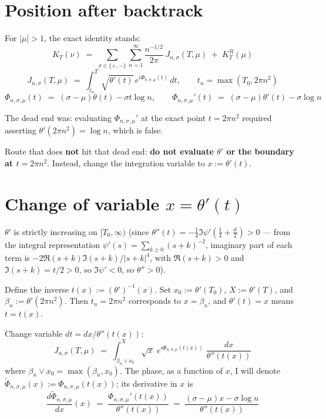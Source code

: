 \section*{Position after backtrack}

For $|\mu|>1$, the exact identity stands:
\[
K_T(\nu) \;=\; \sum_{\sigma\in\{+,-\}}\sum_{n=1}^{\infty}\frac{n^{-1/2}}{2\pi}\,J_{n,\sigma}(T,\mu) \;+\; K_T^{R}(\mu)
\]
\[
J_{n,\sigma}(T,\mu) \;=\; \int_{t_n}^{T}\sqrt{\theta'(t)}\,e^{i\Phi_{n,\sigma,\mu}(t)}\,dt,\qquad t_{n}=\max(T_{0},2\pi n^{2})
\]
\[
\Phi_{n,\sigma,\mu}(t) \;=\; (\sigma-\mu)\theta(t)-\sigma t\log n,\qquad \Phi_{n,\sigma,\mu}'(t) \;=\; (\sigma-\mu)\theta'(t)-\sigma\log n
\]

The dead end was: evaluating $\Phi_{n,\sigma,\mu}'$ at the exact point $t=2\pi n^{2}$ required asserting $\theta'(2\pi n^{2})=\log n$, which is false.

Route that does \textbf{not} hit that dead end: \textbf{do not evaluate $\theta'$ or the boundary at $t=2\pi n^{2}$}. Instead, change the integration variable to $x := \theta'(t)$.

\section*{Change of variable $x = \theta'(t)$}

$\theta'$ is strictly increasing on $[T_{0},\infty)$ (since $\theta''(t) = -\tfrac{1}{4}\Im\psi'(\tfrac{1}{4}+\tfrac{it}{2}) > 0$ --- from the integral representation $\psi'(s) = \sum_{k\ge 0}(s+k)^{-2}$, imaginary part of each term is $-2\Re(s+k)\Im(s+k)/|s+k|^4$, with $\Re(s+k)>0$ and $\Im(s+k) = t/2>0$, so $\Im\psi'<0$, so $\theta''>0$).

Define the inverse $t(x) := (\theta')^{-1}(x)$. Set $x_{0} := \theta'(T_{0})$, $X := \theta'(T)$, and $\beta_{n} := \theta'(2\pi n^{2})$. Then $t_{n}=2\pi n^{2}$ corresponds to $x=\beta_{n}$, and $\theta'(t)=x$ means $t=t(x)$.

Change variable $dt = dx/\theta''(t(x))$:
\[
J_{n,\sigma}(T,\mu) \;=\; \int_{\beta_{n}\vee x_0}^{X}\!\!\sqrt{x}\;e^{i\Phi_{n,\sigma,\mu}(t(x))}\;\frac{dx}{\theta''(t(x))}
\]
where $\beta_{n}\vee x_0 = \max(\beta_{n},x_0)$. The phase, as a function of $x$, I will denote $\widetilde\Phi_{n,\sigma,\mu}(x) := \Phi_{n,\sigma,\mu}(t(x))$; its derivative in $x$ is
\[
\frac{d\widetilde\Phi_{n,\sigma,\mu}}{dx}(x) \;=\; \frac{\Phi_{n,\sigma,\mu}'(t(x))}{\theta''(t(x))} \;=\; \frac{(\sigma-\mu)x-\sigma\log n}{\theta''(t(x))}
\]

